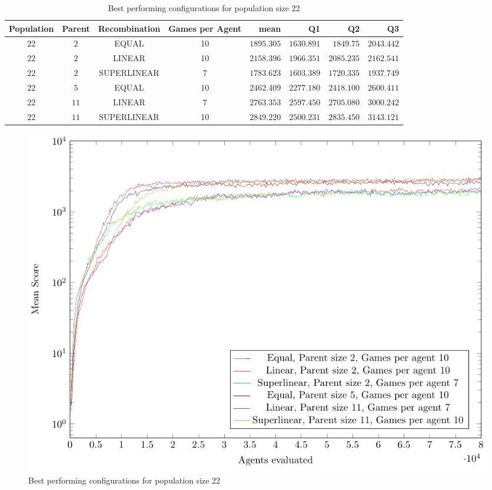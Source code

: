 \begin{table}[H]
\centering
\small
\begin{tabular}{c c c c r r r r}
Population & Parent & Recombination & Games per Agent & mean & Q1 & Q2 & Q3\\
\hline
$22$ & $2$ & EQUAL & 10 & $1895.305$ & $1630.891$ & $1849.75$ & $2043.442$\\
$22$ & $2$ & LINEAR & 10 & $2158.396$ & $1966.351$ & $2085.235$ & $2162.541$\\
$22$ & $2$ & SUPERLINEAR & 7 & $1783.623$ & $1603.389$ & $1720.335$ & $1937.749$\\
$22$ & $5$ & EQUAL & 10 & $2462.409$ & $2277.180$ & $2418.100$ & $2600.411$\\
$22$ & $11$ & LINEAR & 7 & $2763.353$ & $2597.450$ & $2705.080$ & $3000.242$\\
$22$ & $11$ & SUPERLINEAR & 10 & $2849.220$ & $2500.231$ & $2835.450$ & $3143.121$\\
\end{tabular}
\caption{Best performing configurations for population size 22}
\end{table}

\begin{figure}[H]
\centering
\includegraphics[scale=1]{data/cma_population_offspring/bestofeach_population/22x/PlotFile.pdf}
\caption{Best performing configurations for population size 22}
\end{figure}

\clearpage

